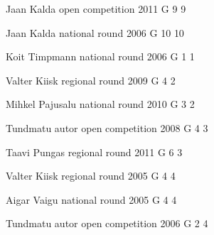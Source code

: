 \documentclass[11pt]{article}
\begin{document}
\ylDisplay{} %
{Jaan Kalda} %
{open competition} %
{2011} %
{G 9} %
{9} %
{

\ifEngSolution
\fi
}

\ylDisplay{} %
{Jaan Kalda} %
{national round} %
{2006} %
{G 10} %
{10} %
{

\ifEngSolution
\fi
}

\ylDisplay{} %
{Koit Timpmann} %
{national round} %
{2006} %
{G 1} %
{1} %
{

\ifEngSolution
\fi
}

\ylDisplay{} %
{Valter Kiisk} %
{regional round} %
{2009} %
{G 4} %
{2} %
{

\ifEngSolution
\fi
}

\ylDisplay{} %
{Mihkel Pajusalu} %
{national round} %
{2010} %
{G 3} %
{2} %
{

\ifEngSolution
\fi
}

\ylDisplay{} %
{Tundmatu autor} %
{open competition} %
{2008} %
{G 4} %
{3} %
{

\ifEngSolution
\fi
}

\ylDisplay{} %
{Taavi Pungas} %
{regional round} %
{2011} %
{G 6} %
{3} %
{

\ifEngSolution
\fi
}

\ylDisplay{} %
{Valter Kiisk} %
{regional round} %
{2005} %
{G 4} %
{4} %
{

\ifEngSolution
\fi
}

\ylDisplay{} %
{Aigar Vaigu} %
{national round} %
{2005} %
{G 4} %
{4} %
{

\ifEngSolution
\fi
}

\ylDisplay{} %
{Tundmatu autor} %
{open competition} %
{2006} %
{G 2} %
{4} %
{

\ifEngSolution
\fi
}
\end{document}
